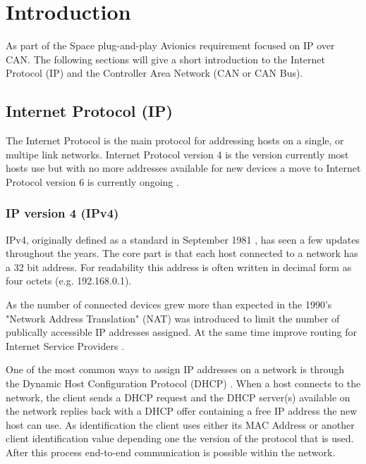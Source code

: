 \section{Introduction}\label{sec:introduction}
As part of the Space plug-and-play Avionics requirement
focused on IP over CAN. The following sections will give a short
introduction to the Internet Protocol (IP) and the Controller Area Network
(CAN or CAN Bus).

\subsection{Internet Protocol (IP)}
The Internet Protocol is the main protocol for addressing hosts on a
single, or multipe link networks. Internet Protocol version 4 is the
version currently most hosts use but with no more addresses available
for new devices a move to Internet Protocol version 6 is currently ongoing
\cite{web:rfc6540}.

\subsubsection{IP version 4 (IPv4)}\label{introduction:ipv4}
IPv4, originally defined as a standard in September 1981 \cite{web:rfc791}, has
seen a few updates throughout the years. The core part is that each host
connected to a network has a 32 bit address. For readability this address
is often written in decimal form as four octets (e.g. 192.168.0.1).

As the number of connected devices grew more than expected in the 1990's
"Network Address Translation" (NAT) was introduced to limit the number of
publically accessible IP addresses assigned. At the same time improve routing for Internet
Service Providers \cite{web:rfc1631, web:rfc1918, web:rfc3022}.

One of the most common ways to assign IP addresses on a network is through the
Dynamic Host Configuration Protocol (DHCP) \cite{web:rfc2131, web:rfc2132, web:rfc4361}.
When a host connects to the network, the client sends a DHCP request and the DHCP
server(s) available on the network replies back with a DHCP offer containing a free
IP address the new host can use. As identification the client uses either its
MAC Address or another client identification value depending one the version of the
protocol that is used. After this process end-to-end communication is possible
within the network.


